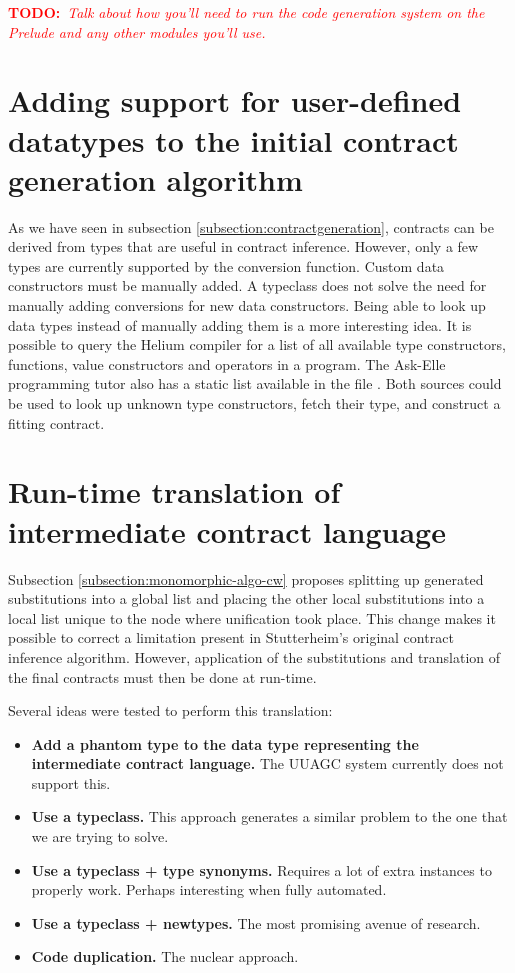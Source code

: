 \documentclass[10pt]{report}
\newcommand{\annotate}[3]{
	\begin{scriptsize}
	\textcolor{#1}{\textbf{#2}~\textit{#3}}
	\end{scriptsize}\newline}
\newcommand{\todo}[1]{\annotate{red} {TODO:} {#1}}
\newcommand{\code}[1]{%
  {%
   \setlength{\fboxsep}{-2\fboxrule}%
   \fcolorbox{black}{light-gray}{\hspace{1.5pt}\strut\texttt{#1}\hspace{1.5pt}}%
  }%
}
\begin{document}
{\todo{Talk about how you'll need to run the code generation system on the Prelude and any other modules you'll use.}

\section{Adding support for user-defined datatypes to the initial contract generation algorithm}
\label{datatype-support-initial-contracts-algorithm}

As we have seen in subsection \ref{subsection:contractgeneration}, contracts can be derived from types that are useful in contract inference.
However, only a few types are currently supported by the conversion function.
Custom data constructors must be manually added.
A typeclass does not solve the need for manually adding conversions for new data constructors. 
Being able to look up data types instead of manually adding them is a more interesting idea.
It is possible to query the Helium compiler for a list of all available type constructors, functions, value constructors and operators in a program.
The Ask-Elle programming tutor also has a static list available in the file \code{Domain\textbackslash FP\textbackslash HeliumImportEnvs.hs}.
Both sources could be used to look up unknown type constructors, fetch their type, and construct a fitting contract.

\section{Run-time translation of intermediate contract language}
\label{futurework:runtimetranslation}

Subsection \ref{subsection:monomorphic-algo-cw} proposes splitting up generated substitutions into a global list and placing the other local substitutions into a local list unique to the node where unification took place.
This change makes it possible to correct a limitation present in Stutterheim's original contract inference algorithm.
However, application of the substitutions and translation of the final contracts must then be done at run-time.

Several ideas were tested to perform this translation:
\begin{itemize}
	\item \textbf{Add a phantom type to the data type representing the intermediate contract language.} The UUAGC system currently does not support this.
	\item \textbf{Use a typeclass.} This approach generates a similar problem to the one that we are trying to solve.
	\item \textbf{Use a typeclass + type synonyms.} Requires a lot of extra instances to properly work. Perhaps interesting when fully automated.
	\item \textbf{Use a typeclass + newtypes.} The most promising avenue of research.
	\item \textbf{Code duplication.} The nuclear approach.
\end{itemize}

}
\end{document}
